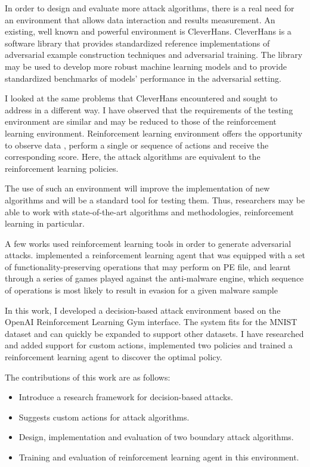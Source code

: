 \documentclass{article}
\begin{document}
In order to design and evaluate more attack algorithms, there is a real need for an environment that allows data interaction and results measurement. An existing, well known and powerful environment is CleverHans. CleverHans \cite{papernot2018cleverhans} is a software library that provides standardized reference implementations of adversarial example construction techniques and adversarial training. The library may be used to develop more robust machine learning models and to provide standardized benchmarks of models' performance in the adversarial setting. 

I looked at the same problems that CleverHans encountered and sought to address in a different way. I have observed that the requirements of the testing environment are similar and may be reduced to those of the reinforcement learning environment.
Reinforcement learning environment offers the opportunity to observe data , perform a single or sequence of actions and receive the corresponding score. Here, the attack algorithms are equivalent to the reinforcement learning policies.

The use of such an environment will improve the implementation of new algorithms and will be a standard tool for testing them. Thus, researchers may be able to work with state-of-the-art algorithms and methodologies, reinforcement learning in particular.

A few works used reinforcement learning tools in order to generate adversarial attacks. \cite{hyrum2017evading} implemented a reinforcement learning agent that was equipped with a set of functionality-preserving operations that  may perform on PE file, and learnt through a series of games played against the anti-malware engine, which
sequence of operations is most likely to result in evasion for a given malware sample

In this work, I developed a decision-based attack environment based on the OpenAI Reinforcement Learning Gym \cite{brockman2016openai} interface. The system fits for the MNIST dataset \cite{mnist10027939599} and can quickly be expanded to support other datasets. I have researched and added support for custom actions, implemented two policies and trained a reinforcement learning agent to discover the optimal policy.

The contributions of this work are as follows:
\begin{itemize}
\item Introduce a research framework for decision-based attacks. 
\item Suggests custom actions for attack algorithms.
\item Design, implementation and evaluation of two boundary attack algorithms.
\item Training and evaluation of reinforcement learning agent in this environment.
\end{itemize}
\end{document}

